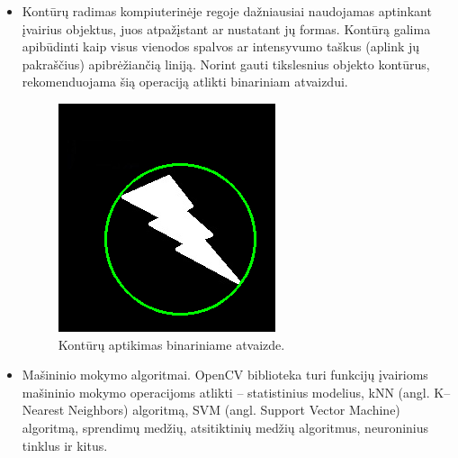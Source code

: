 \documentclass[a4paper,12pt]{article}
\begin{document}
\begin{itemize}
	\item Kontūrų radimas kompiuterinėje regoje dažniausiai naudojamas aptinkant įvairius objektus, juos atpažįstant ar nustatant jų formas. Kontūrą galima apibūdinti kaip visus vienodos spalvos ar intensyvumo taškus (aplink jų pakraščius) apibrėžiančią liniją. Norint gauti tikslesnius objekto kontūrus, rekomenduojama šią operaciją atlikti binariniam atvaizdui.
	\begin{figure}[H]
		\centering
		\includegraphics[scale=0.3]{images/contours}
		\caption{Kontūrų aptikimas binariniame atvaizde.}   %
		\label{img:contours}
	\end{figure} 
	
	\item Mašininio mokymo algoritmai. OpenCV biblioteka turi funkcijų įvairioms mašininio mokymo operacijoms atlikti – statistinius modelius, kNN (angl. K–Nearest Neighbors) algoritmą, SVM (angl. Support Vector Machine) algoritmą, sprendimų medžių, atsitiktinių medžių algoritmus, neuroninius tinklus ir kitus.
	

\end{itemize}
\end{document}
